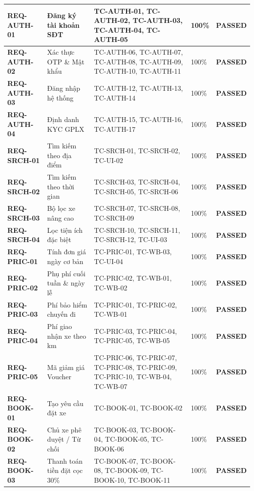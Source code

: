{\begin{longtable}{p{2.3cm}p{3.5cm}p{5.8cm}p{1.7cm}p{1.8cm}}
\textbf{REQ-AUTH-01} & Đăng ký tài khoản SĐT & TC-AUTH-01, TC-AUTH-02, TC-AUTH-03, TC-AUTH-04, TC-AUTH-05 & 100\% & \textbf{PASSED} \\ \midrule
\textbf{REQ-AUTH-02} & Xác thực OTP \& Mật khẩu & TC-AUTH-06, TC-AUTH-07, TC-AUTH-08, TC-AUTH-09, TC-AUTH-10, TC-AUTH-11 & 100\% & \textbf{PASSED} \\ \midrule
\textbf{REQ-AUTH-03} & Đăng nhập hệ thống & TC-AUTH-12, TC-AUTH-13, TC-AUTH-14 & 100\% & \textbf{PASSED} \\ \midrule
\textbf{REQ-AUTH-04} & Định danh KYC GPLX & TC-AUTH-15, TC-AUTH-16, TC-AUTH-17 & 100\% & \textbf{PASSED} \\ \midrule
\textbf{REQ-SRCH-01} & Tìm kiếm theo địa điểm & TC-SRCH-01, TC-SRCH-02, TC-UI-02 & 100\% & \textbf{PASSED} \\ \midrule
\textbf{REQ-SRCH-02} & Tìm kiếm theo thời gian & TC-SRCH-03, TC-SRCH-04, TC-SRCH-05, TC-SRCH-06 & 100\% & \textbf{PASSED} \\ \midrule
\textbf{REQ-SRCH-03} & Bộ lọc xe nâng cao & TC-SRCH-07, TC-SRCH-08, TC-SRCH-09 & 100\% & \textbf{PASSED} \\ \midrule
\textbf{REQ-SRCH-04} & Lọc tiện ích đặc biệt & TC-SRCH-10, TC-SRCH-11, TC-SRCH-12, TC-UI-03 & 100\% & \textbf{PASSED} \\ \midrule
\textbf{REQ-PRIC-01} & Tính đơn giá ngày cơ bản & TC-PRIC-01, TC-WB-03, TC-UI-04 & 100\% & \textbf{PASSED} \\ \midrule
\textbf{REQ-PRIC-02} & Phụ phí cuối tuần \& ngày lễ & TC-PRIC-02, TC-WB-01, TC-WB-02 & 100\% & \textbf{PASSED} \\ \midrule
\textbf{REQ-PRIC-03} & Phí bảo hiểm chuyến đi & TC-PRIC-01, TC-PRIC-02, TC-WB-01 & 100\% & \textbf{PASSED} \\ \midrule
\textbf{REQ-PRIC-04} & Phí giao nhận xe theo km & TC-PRIC-03, TC-PRIC-04, TC-PRIC-05, TC-WB-05 & 100\% & \textbf{PASSED} \\ \midrule
\textbf{REQ-PRIC-05} & Mã giảm giá Voucher & TC-PRIC-06, TC-PRIC-07, TC-PRIC-08, TC-PRIC-09, TC-PRIC-10, TC-WB-04, TC-WB-07 & 100\% & \textbf{PASSED} \\ \midrule
\textbf{REQ-BOOK-01} & Tạo yêu cầu đặt xe & TC-BOOK-01, TC-BOOK-02 & 100\% & \textbf{PASSED} \\ \midrule
\textbf{REQ-BOOK-02} & Chủ xe phê duyệt / Từ chối & TC-BOOK-03, TC-BOOK-04, TC-BOOK-05, TC-BOOK-06 & 100\% & \textbf{PASSED} \\ \midrule
\textbf{REQ-BOOK-03} & Thanh toán tiền đặt cọc 30\% & TC-BOOK-07, TC-BOOK-08, TC-BOOK-09, TC-BOOK-10, TC-BOOK-11 & 100\% & \textbf{PASSED} \\ \midrule

\end{longtable}}
